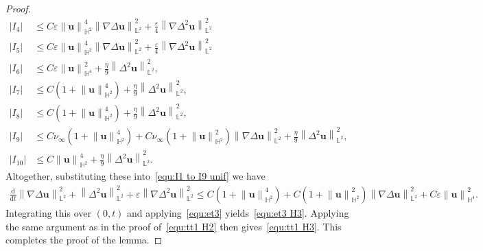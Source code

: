 \documentclass[11pt, reqno]{amsart}
\theoremstyle{definition}
\numberwithin{equation}{section}
\newcommand{\bff}{\boldsymbol}
\newcommand{\bb}{\mathbb}
\newcommand{\ddt}{\frac{\mathrm{d}}{\mathrm{d}t}}
\newcommand{\norm}[2]{\left\|{#1}\right\|_{#2}}
\newcommand{\abs}[1]{\left|{#1}\right|}
\begin{document}
\begin{proof}
\begin{align*}
    \abs{I_4}
    &\leq
    C\varepsilon \norm{\bff{u}}{\bb{H}^2}^4 \norm{\nabla\Delta \bff{u}}{\bb{L}^2}^2
    +
    \frac{\varepsilon}{4} \norm{\nabla\Delta^2 \bff{u}}{\bb{L}^2}^2
    \\
    \abs{I_5}
    &\leq
    C\varepsilon \norm{\bff{u}}{\bb{H}^2}^4 \norm{\nabla\Delta \bff{u}}{\bb{L}^2}^2
    +
    \frac{\varepsilon}{4} \norm{\nabla\Delta^2 \bff{u}}{\bb{L}^2}^2
    \\
    \abs{I_6}
    &\leq
    C\varepsilon \norm{\bff{u}}{\bb{H}^4}^2
    +
    \frac{\eta}{9} \norm{\Delta^2 \bff{u}}{\bb{L}^2}^2,
    \\
    \abs{I_7}
    &\leq
    C\left(1+ \norm{\bff{u}}{\bb{H}^2}^4 \right) + \frac{\eta}{9} \norm{\Delta^2 \bff{u}}{\bb{L}^2}^2,
    \\
    \abs{I_8}
    &\leq
    C\left(1+ \norm{\bff{u}}{\bb{H}^2}^4 \right) + \frac{\eta}{9} \norm{\Delta^2 \bff{u}}{\bb{L}^2}^2,
    \\
    \abs{I_9}
    &\leq
    C\nu_\infty \left(1+\norm{\bff{u}}{\bb{H}^2}^4 \right) 
    + C\nu_\infty \left(1+ \norm{\bff{u}}{\bb{H}^2}^2 \right) \norm{\nabla\Delta \bff{u}}{\bb{L}^2}^2
    + \frac{\eta}{9} \norm{\Delta^2 \bff{u}}{\bb{L}^2}^2,
    \\
    \abs{I_{10}}
    &\leq
    C\norm{\bff{u}}{\bb{H}^2}^4 + \frac{\eta}{9} \norm{\Delta^2 \bff{u}}{\bb{L}^2}^2.
\end{align*}
Altogether, substituting these into~\eqref{equ:I1 to I9 unif} we have
\begin{align*}
    \ddt \norm{\nabla\Delta \bff{u}}{\bb{L}^2}^2
    +
    \norm{\Delta^2 \bff{u}}{\bb{L}^2}^2
    +
    \varepsilon\norm{\nabla\Delta^2 \bff{u}}{\bb{L}^2}^2
    \leq
    C\left(1+\norm{\bff{u}}{\bb{H}^2}^4 \right)
    +
    C\left(1+\norm{\bff{u}}{\bb{H}^2}^2\right) \norm{\nabla\Delta \bff{u}}{\bb{L}^2}^2
    +
    C\varepsilon \norm{\bff{u}}{\bb{H}^4}^2.
\end{align*}
Integrating this over $(0,t)$ and applying~\eqref{equ:et3} yields~\eqref{equ:et3 H3}. Applying the same argument as in the proof of~\eqref{equ:tt1 H2} then gives~\eqref{equ:tt1 H3}. This completes the proof of the lemma.
\end{proof}
\end{document}
